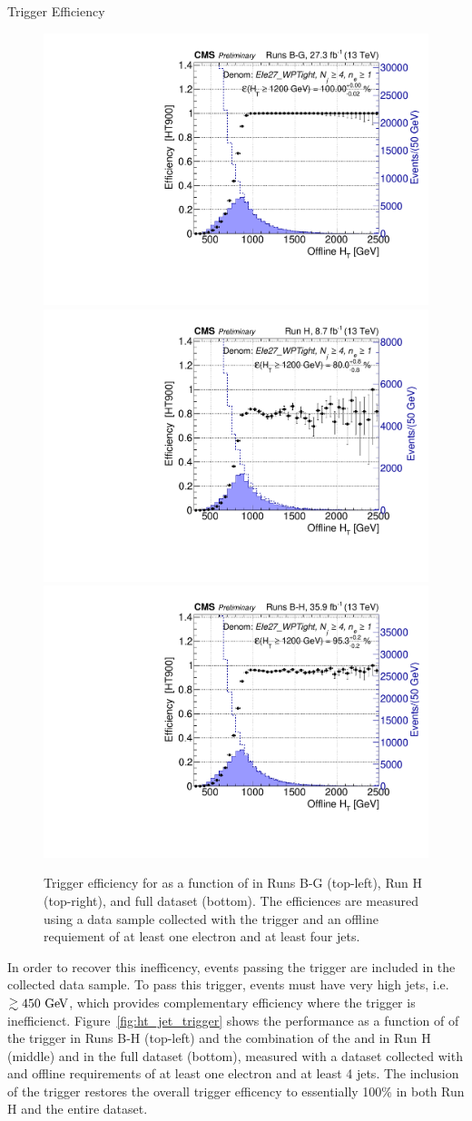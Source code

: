 \begin{section}{Trigger Efficiency}
\begin{figure}[tbp!]
\centering
\includegraphics[angle=0,width=0.45\columnwidth]{fig/trig_ht_runsbg.pdf}
\includegraphics[angle=0,width=0.45\columnwidth]{fig/trig_ht_runh.pdf}
\includegraphics[angle=0,width=0.45\columnwidth]{fig/trig_ht_runsbh.pdf}
\caption{Trigger efficiency for \trigHT as a function of \HT in Runs B-G (top-left), Run H (top-right), and full dataset (bottom). 
The efficiences are measured using a data sample collected with the \trigEle trigger and an offline requiement of at least one electron and at least four jets.}
\label{fig:ht_trigger}
\end{figure}

In order to recover this inefficency, events passing the \trigJet trigger are included in the collected data sample.
To pass this trigger, events must have very high \pT jets, i.e. $\gtrsim 450~\mathrm{Ge\kern -0.1em V}$, which provides complementary efficiency where the \trigHT trigger is inefficienct.
Figure~\ref{fig:ht_jet_trigger} shows the performance as a function of \HT of the \trigJet trigger in Runs B-H (top-left) and the combination of the \trigHT and \trigJet in Run H (middle) and in the full dataset (bottom), measured with a dataset collected with \trigEle and offline requirements of at least one electron and at least 4 jets.
The inclusion of the \trigJet trigger restores the overall trigger efficency to essentially 100\% in both Run H and the entire dataset.


\end{section}

